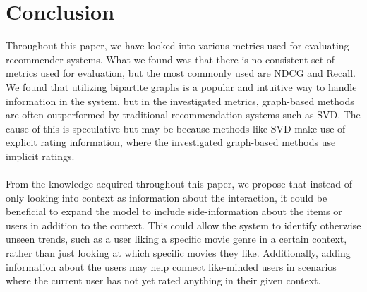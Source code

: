 \section{Conclusion}\label{sec:conclusion}
Throughout this paper, we have looked into various metrics used for evaluating recommender systems. What we found was that there is no consistent set of metrics used for evaluation, but the most commonly used are NDCG and Recall.
We found that utilizing bipartite graphs is a popular and intuitive way to handle information in the system, but in the investigated metrics, graph-based methods are often outperformed by traditional recommendation systems such as SVD.
The cause of this is speculative but may be because methods like SVD make use of explicit rating information, where the investigated graph-based methods use implicit ratings.
\\\\
From the knowledge acquired throughout this paper, we propose that instead of only looking into context as information about the interaction, it could be beneficial to expand the model to include side-information about the items or users in addition to the context.
This could allow the system to identify otherwise unseen trends, such as a user liking a specific movie genre in a certain context, rather than just looking at which specific movies they like.
Additionally, adding information about the users may help connect like-minded users in scenarios where the current user has not yet rated anything in their given context.
